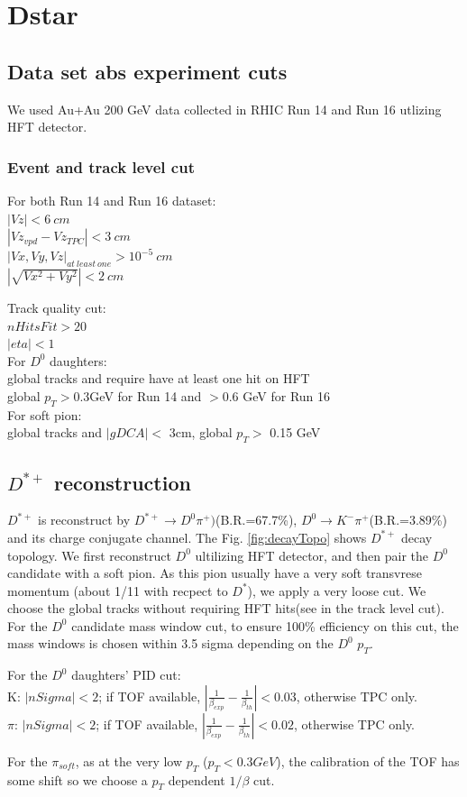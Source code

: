\clearpage

\section{Dstar}
\subsection{Data set abs experiment cuts}
We used Au+Au 200 GeV data collected in RHIC Run 14 and Run 16 utlizing HFT detector. 
\subsubsection{Event and track level cut}
For both Run 14 and Run 16 dataset: \\
$|Vz|<6~cm$ \\
$|Vz_{vpd}-Vz_{TPC}|< 3~cm$ \\
$|Vx,Vy,Vz|_{at~least~one}> 10^{-5}~cm$\\
$|\sqrt{Vx^{2}+Vy^{2}}|< 2~cm$ 
\par
Track quality cut:\\
$nHitsFit > 20$\\
$|eta|<1$\\
For $D^{0}$ daughters:\\
 global tracks and require have at least one hit on HFT\\
 global $p_{T}>$0.3GeV for Run 14 and $>$0.6 GeV for Run 16\\
For soft pion:\\
 global tracks and $|gDCA|<$  3cm, global $p_{T}>$ 0.15 GeV
\subsection{$D^{*+}$ reconstruction}
	$D^{*+}$ is reconstruct by $D^{*+}\rightarrow D^{0}\pi^{+})$(B.R.=67.7\%), $D^{0}\rightarrow K^{-}\pi^{+}$(B.R.=3.89\%) and its charge conjugate channel. The Fig. \ref{fig:decayTopo} shows $D^{*+}$ decay topology. We first reconstruct $D^{0}$ ultilizing HFT detector, and then pair the $D^{0}$ candidate with a soft pion. As this pion usually have a very soft transvrese momentum (about 1/11 with recpect to $D^{*}$), we apply a very loose cut. We choose the global tracks without requiring HFT hits(see in the track level cut). For the $D^{0}$ candidate mass window cut, to ensure 100\% efficiency on this cut, the mass windows is chosen within 3.5 sigma depending on the $D^{0}$ $p_{T}$.  
	\par
	For the $D^{0}$ daughters' PID cut:\\
	K: $|nSigma|<2$; if TOF available, $|\frac{1}{\beta_{exp}}-\frac{1}{\beta_{th}}|<0.03$, otherwise TPC only.
\\
	$\pi$: $|nSigma|<2$; if TOF available, $|\frac{1}{\beta_{exp}}-\frac{1}{\beta_{th}}|<0.02$, otherwise TPC only.
	\par
	For the $\pi_{soft}$, as at the very low $p_{T}$ ($p_{T}<0.3 GeV$), the calibration of the TOF has some shift so we choose a $p_{T}$ dependent $1/\beta$ cut.
	
